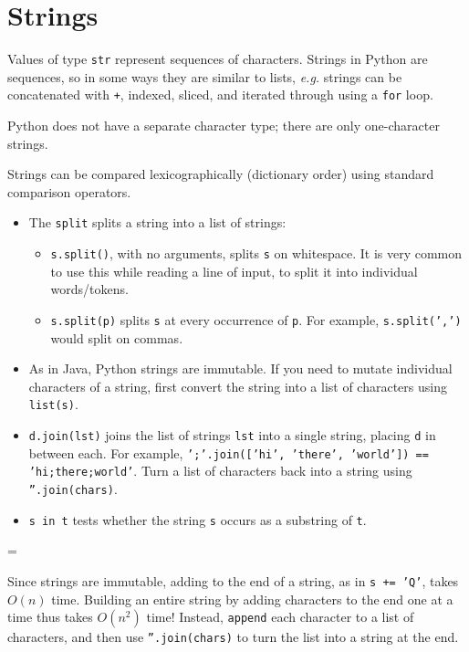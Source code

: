 \documentclass[10pt]{book}
\newcommand{\py}[1]{\texttt{#1}}
\newenvironment{warning}
{\par\begin{mdframed}[linewidth=2pt,linecolor=red]%
    \begin{list}{}{\leftmargin=1cm
        \labelwidth=\leftmargin}\item[\Large\ding{43}]}
    {\end{list}\end{mdframed}\par}
\begin{document}
\section{Strings}

Values of type \py{str} represent sequences of characters.  Strings in
Python are sequences, so in some ways they are similar to lists,
\emph{e.g.} strings can be concatenated with \py{+}, indexed,
sliced, and iterated through using a \py{for} loop.

Python does not have a separate character type; there are only
one-character strings.

Strings can be compared lexicographically (dictionary order) using
standard comparison operators.

\begin{itemize}
\item The \py{split} splits a string into a list of strings:
  \begin{itemize}
  \item \py{s.split()}, with no arguments, splits \py{s} on
    whitespace.  It is very common to use this while reading a line of
    input, to split it into individual words/tokens.
  \item \py{s.split(p)} splits \py{s} at every occurrence of \py{p}.
    For example, \py{s.split(',')} would split on commas.
  \end{itemize}
\item As in Java, Python strings are immutable.  If you need to mutate
  individual characters of a string, first convert the string into a
  list of characters using \py{list(s)}.
\item \py{d.join(lst)} joins the list of strings \py{lst} into a
  single string, placing \py{d} in between each.  For example,
  \py{';'.join(['hi', 'there', 'world']) == 'hi;there;world'}.  Turn a
  list of characters back into a string using \py{''.join(chars)}.
\item \py{s in t} tests whether the string \py{s} occurs as a
  substring of \py{t}.
\end{itemize}

\begin{warning}
  Since strings are immutable, adding to the end of a string, as in
  \py{s += 'Q'}, takes $O(n)$ time.  Building an entire string by
  adding characters to the end one at a time thus takes $O(n^2)$
  time!  Instead, \py{append} each character to a list of
  characters, and then use \py{''.join(chars)} to turn the list into
  a string at the end.
\end{warning}
\end{document}
